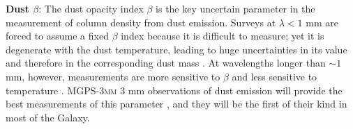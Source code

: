 \documentclass[11pt,preprint]{aastex_nofoot}
\newcommand{\MUSTANG}{\textsc{MUSTANG-2}\xspace}
\newcommand{\MGPS}{\textsc{MGPS-3mm}\xspace}
\begin{document}

\textbf{Dust $\beta$}:
The dust opacity index $\beta$ is the key uncertain parameter in the
measurement of column density from dust emission.  Surveys at $\lambda<1$ mm
are forced to assume a fixed $\beta$ index because it is difficult to
measure; yet it is degenerate with the dust temperature, leading to huge
uncertainties in its value and therefore in the corresponding dust mass
\citep[e.g.,][]{Juvela2012a}.  At wavelengths longer than $\sim1$ mm, however,
measurements are more sensitive to
$\beta$ and less sensitive to temperature \citep[e.g.,][]{Rigby2018a}.  \MGPS 3 mm
observations of dust emission will provide the best measurements of this
parameter \citep{Schnee2014b}, and they will be the first of
their kind in most of the Galaxy.



\end{document}
